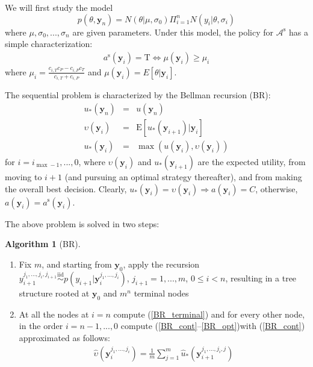 \documentclass{article}
\begin{document}
We will first study the model
\begin{equation}
\label{normal_normal} p(\theta,\mathbf{y}_{n}) =
N(\theta|\mu,\sigma_0)\Pi_{i=1}^{n} N(y_i|\theta,\sigma_i)
\end{equation}where $\mu,\sigma_0,...,\sigma_{n}$ are given
parameters. Under this model, the policy for
$\mathcal{A}^{\mathrm{s}}$ has a simple characterization:
\begin{eqnarray}\label{T_or_P}a^{\mathrm{s}}(\mathbf{y}_i)=\mathrm{T}
\Leftrightarrow \mu(\mathbf{y}_{i})\geq \mu_i\end{eqnarray}where
$\mu_i=\frac{c_{i,T}c_{P}-c_{i,P}c_{T}}{c_{i,T}+c_{i,P}}$ and
$\mu(\mathbf{y}_i)=E[\theta|\mathbf{y}_i]$.

The sequential problem is characterized by the Bellman recursion
(BR):
\begin{eqnarray}\label{BR_terminal}
u_*(\mathbf{y}_{n}) &=& u(\mathbf{y}_{n})\\
\label{BR_cont}
\upsilon(\mathbf{y}_i)&=&\mathrm{E}[u_*(\mathbf{y}_{i+1})|\mathbf{y}_i]\\
\label{BR_opt}
u_*(\mathbf{y}_i)&=&\max(u(\mathbf{y}_i),\upsilon(\mathbf{y}_i))
\end{eqnarray}for $i=i_{\max-1},...,0$, where $\upsilon(\mathbf{y}_i)$ and
$u_*(\mathbf{y}_{i+1})$ are the expected utility, from moving to
$i+1$ (and pursuing an optimal strategy thereafter), and from making
the overall best decision. Clearly,
$u_*(\mathbf{y}_i)=\upsilon(\mathbf{y}_i)\Rightarrow
a(\mathbf{y}_i)=C$, otherwise,
$a(\mathbf{y}_i)=a^{\mathrm{s}}(\mathbf{y}_i)$.

The above problem is solved in two steps: \theoremstyle{definition}
\newtheorem{algorithm}{Algorithm}
\begin{algorithm}[BR]\label{alg:BR}
\hfill\par
\begin{enumerate}\item Fix $m$, and starting from
$\mathbf{y}_0$, apply the recursion $y_{i+1}^{j_1,...,j_{i},j_{i+1}}
\stackrel{\mathrm{iid}}{\sim}
p(y_{i+1}|\mathbf{y}_i^{j_1,...,j_{i}})$, $j_{i+1}=1,...,m$, $0\leq
i<n$, resulting in a tree structure rooted at $\mathbf{y}_0$ and
$m^{n}$ terminal nodes
\item At all the nodes at $i=n$ compute (\ref{BR_terminal}) and for every other node,
in the order $i=n-1,...,0$ compute (\ref{BR_cont}--\ref{BR_opt})with
(\ref{BR_cont}) approximated as follows:
\begin{align}\label{BR_est_upsilon}
\hat\upsilon(\mathbf{y}_i^{j_1,...,j_i})=\frac{1}{m} \sum_{j=1}^m
\hat u_*(\mathbf{y}_{i+1}^{j_1,...,j_i,j})
\end{align}
\end{enumerate}
\end{algorithm}
\end{document}
